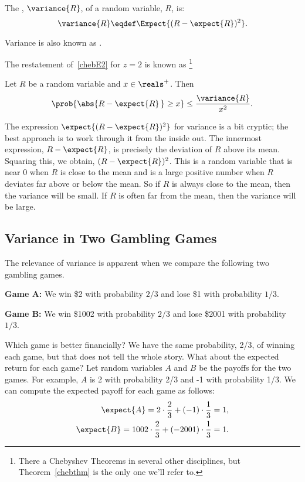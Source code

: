\begin{definition}\label{defvar}
The , $\variance{R}$, of a random variable, $R$, is:
\[
\variance{R} \eqdef \Expect{(R - \expect{R})^2}.
\]

\end{definition}
Variance is also known as .

The restatement of~\eqref{chebE2} for $z=2$ is known as
\footnote{There a Chebyshev Theorems in
  several other disciplines, but Theorem~\ref{chebthm} is the only one
  we'll refer to.}
\begin{theorem}[Chebyshev]\label{chebthm}
  Let $R$ be a random variable and $x \in \reals^+$.  Then
\[
\prob{\abs{R - \expect{R}\, } \geq x} \leq \frac{\variance{R}}{x^2}.
\]
\end{theorem}

The expression $\expect{(R - \expect{R})^2}$ for variance is a bit
cryptic; the best approach is to work through it from the inside out.  The
innermost expression, $R - \expect{R}$, is precisely the deviation of $R$
above its mean.  Squaring this, we obtain, $(R - \expect{R})^2$.  This is
a random variable that is near 0 when $R$ is close to the mean and is a
large positive number when $R$ deviates far above or below the mean.  So
if $R$ is always close to the mean, then the variance will be small.  If
$R$ is often far from the mean, then the variance will be large.

\subsection{Variance in Two Gambling Games}

The relevance of variance is apparent when we compare the following
two gambling games.

\textbf{Game A:} We win \$2 with probability $2/3$ and lose \$1 with probability
$1/3$.

\textbf{Game B:} We win \$1002 with probability $2/3$ and lose \$2001 with
probability $1/3$.

Which game is better financially?  We have the same probability, 2/3,
of winning each game, but that does not tell the whole story.  What about
the expected return for each game?  Let random variables $A$ and $B$ be
the payoffs for the two games.  For example, $A$ is 2 with probability
2/3 and -1 with probability 1/3.  We can compute the
expected payoff for each game as follows:
\begin{eqnarray*}
\expect{A} = 2 \cdot \frac{2}{3} + (-1) \cdot \frac{1}{3} = 1, \\
\expect{B} = 1002 \cdot \frac{2}{3} + (-2001) \cdot \frac{1}{3} = 1.
\end{eqnarray*}

